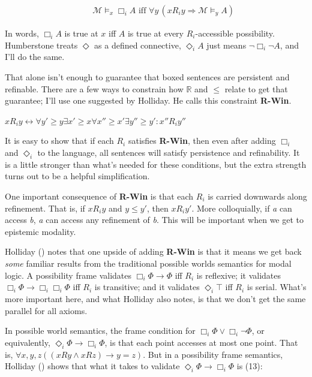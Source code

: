 \documentclass[
  11pt,
  letterpaper,
  DIV=11,
  numbers=noendperiod,
  twoside]{scrartcl}
\providecommand{\tightlist}{%
  \setlength{\itemsep}{0pt}\setlength{\parskip}{0pt}}
\begin{document}
\begin{align*}
[\Box_i] \quad & \mathcal{M} \models_x \Box_i A \text{ iff } \forall y \, (x R_i y \Rightarrow \mathcal{M} \models_y A)
\end{align*}

In words, \(\Box_i A\) is true at \(x\) iff \(A\) is true at every
\(R_i\)-accessible possibility. Humberstone treats \(\Diamond\) as a
defined connective, \(\Diamond_i A\) just means \(\neg \Box_i \neg A\),
and I'll do the same.

That alone isn't enough to guarantee that boxed sentences are persistent
and refinable. There are a few ways to constrain how \(\mathbb{R}\) and
\(\leqslant\) relate to get that guarantee; I'll use one suggested by
Holliday. He calls this constraint \textbf{R-Win}.

\begin{description}
\tightlist
\item[\textbf{R-Win}]
\(xR_iy \leftrightarrow \forall y' \geqslant y \exists x' \geqslant x \forall x'' \geqslant x' \exists y'' \geqslant y': x''R_iy''\)
\end{description}

It is easy to show that if each \(R_i\) satisfies \textbf{R-Win}, then
even after adding \(\Box_i\) and \(\Diamond_i\) to the language, all
sentences will satisfy persistence and refinability. It is a little
stronger than what's needed for these conditions, but the extra strength
turns out to be a helpful simplification.

One important consequence of \textbf{R-Win} is that each \(R_i\) is
carried downwards along refinement. That is, if \(x R_i y\) and
\(y \leqslant y'\), then \(x R_i y'\). More colloquially, if \emph{a}
can access \emph{b}, \emph{a} can access any refinement of \emph{b}.
This will be important when we get to epistemic modality.

Holliday () notes that one
upside of adding \textbf{R-Win} is that it means we get back \emph{some}
familiar results from the traditional possible worlds semantics for
modal logic. A possibility frame validates
\(\Box_i \Phi \rightarrow \Phi\) iff \(R_i\) is reflexive; it validates
\(\Box_i \Phi \rightarrow \Box_i \Box_i \Phi\) iff \(R_i\) is
transitive; and it validates \(\Diamond_i \top\) iff \(R_i\) is serial.
What's more important here, and what Holliday also notes, is that we
don't get the same parallel for all axioms.

In possible world semantics, the frame condition for
\(\Box_i \Phi \vee \Box_i \neg \Phi\), or equivalently,
\(\Diamond_i \Phi \rightarrow \Box_i \Phi\), is that each point accesses
at most one point. That is,
\(\forall x, y, z ((xRy \wedge xRz) \rightarrow y = z)\). But in a
possibility frame semantics, Holliday () shows that what it takes to validate
\(\Diamond_i \Phi \rightarrow \Box_i \Phi\) is (13):
\end{document}
